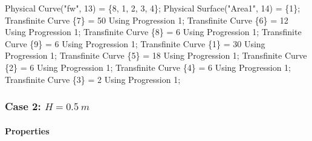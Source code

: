\documentclass[11pt]{article}
\newenvironment{Shaded}{}{}
\newcommand{\DecValTok}[1]{\textcolor[rgb]{0.25,0.63,0.44}{{#1}}}
\newcommand{\StringTok}[1]{\textcolor[rgb]{0.25,0.44,0.63}{{#1}}}
\newcommand{\NormalTok}[1]{{#1}}
\newcommand{\OperatorTok}[1]{\textcolor[rgb]{0.40,0.40,0.40}{{#1}}}
\begin{document}
\begin{Shaded}
\begin{Highlighting}[]
\NormalTok{Physical Curve}\OperatorTok{(}\StringTok{"fw"}\OperatorTok{,} \DecValTok{13}\OperatorTok{)} \OperatorTok{=} \OperatorTok{\{}\DecValTok{8}\OperatorTok{,} \DecValTok{1}\OperatorTok{,} \DecValTok{2}\OperatorTok{,} \DecValTok{3}\OperatorTok{,} \DecValTok{4}\OperatorTok{\};}
\NormalTok{Physical Surface}\OperatorTok{(}\StringTok{"Area1"}\OperatorTok{,} \DecValTok{14}\OperatorTok{)} \OperatorTok{=} \OperatorTok{\{}\DecValTok{1}\OperatorTok{\};}
\NormalTok{Transfinite Curve }\OperatorTok{\{}\DecValTok{7}\OperatorTok{\}} \OperatorTok{=} \DecValTok{50}\NormalTok{ Using Progression }\DecValTok{1}\OperatorTok{;}
\NormalTok{Transfinite Curve }\OperatorTok{\{}\DecValTok{6}\OperatorTok{\}} \OperatorTok{=} \DecValTok{12}\NormalTok{ Using Progression }\DecValTok{1}\OperatorTok{;}
\NormalTok{Transfinite Curve }\OperatorTok{\{}\DecValTok{8}\OperatorTok{\}} \OperatorTok{=} \DecValTok{6}\NormalTok{ Using Progression }\DecValTok{1}\OperatorTok{;}
\NormalTok{Transfinite Curve }\OperatorTok{\{}\DecValTok{9}\OperatorTok{\}} \OperatorTok{=} \DecValTok{6}\NormalTok{ Using Progression }\DecValTok{1}\OperatorTok{;}
\NormalTok{Transfinite Curve }\OperatorTok{\{}\DecValTok{1}\OperatorTok{\}} \OperatorTok{=} \DecValTok{30}\NormalTok{ Using Progression }\DecValTok{1}\OperatorTok{;}
\NormalTok{Transfinite Curve }\OperatorTok{\{}\DecValTok{5}\OperatorTok{\}} \OperatorTok{=} \DecValTok{18}\NormalTok{ Using Progression }\DecValTok{1}\OperatorTok{;}
\NormalTok{Transfinite Curve }\OperatorTok{\{}\DecValTok{2}\OperatorTok{\}} \OperatorTok{=} \DecValTok{6}\NormalTok{ Using Progression }\DecValTok{1}\OperatorTok{;}
\NormalTok{Transfinite Curve }\OperatorTok{\{}\DecValTok{4}\OperatorTok{\}} \OperatorTok{=} \DecValTok{6}\NormalTok{ Using Progression }\DecValTok{1}\OperatorTok{;}
\NormalTok{Transfinite Curve }\OperatorTok{\{}\DecValTok{3}\OperatorTok{\}} \OperatorTok{=} \DecValTok{2}\NormalTok{ Using Progression }\DecValTok{1}\OperatorTok{;}
\end{Highlighting}
\end{Shaded}

\hypertarget{case-2-h-0.5-m}{%
\subsubsection{\texorpdfstring{Case 2:
\(H = 0.5\ m\)}{Case 2: H = 0.5\textbackslash{} m}}\label{case-2-h-0.5-m}}

\hypertarget{properties-2}{%
\paragraph{Properties}\label{properties-2}}
\end{document}
